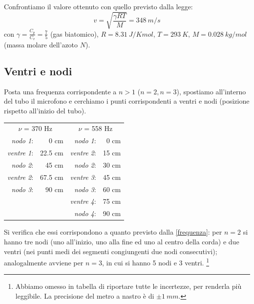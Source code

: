 
   
Confrontiamo il valore ottenuto con quello previsto dalla legge:
\begin{equation}
v=\sqrt{\frac{\gamma R T}{M}} = 348\ m/s
\end{equation}
con $\gamma=\displaystyle{\frac{C_p}{C_v}}=\frac{7}{5}$ (gas biatomico), $R=8.31\ J/K mol$, $T=293\ K$, $M= 0.028\ kg/mol$ (massa molare dell'azoto $N$).

\subsection{Ventri e nodi}

Posta una frequenza corrispondente a $n>1$ ($n=2, n=3$), spostiamo all'interno del tubo il microfono e cerchiamo i punti corrispondenti a ventri e nodi (posizione rispetto all'inizio del tubo).\\

\begin{center}
\begin{tabular}{r r r r}

\multicolumn{2}{c}{$\nu$ = 370 Hz}& \multicolumn{2}{c}{$\nu$ = 558 Hz}\\
\textit{nodo 1}:& 0 cm & \hspace{2cm}\textit{nodo 1}:& 0 cm\\
\textit{ventre 1}:& 22.5 cm & \hspace{2cm}\textit{ventre 2}:& 15 cm\\
\textit{nodo 2}:& 45 cm &\hspace{2cm}\textit{nodo 2}:& 30 cm\\
\textit{ventre 2}:& 67.5 cm &\hspace{2cm}\textit{ventre 3}:& 45 cm\\
\textit{nodo 3}:& 90 cm &\hspace{2cm} \textit{nodo 3}:& 60 cm\\
& & \textit{ventre 4}:& 75 cm \\
& & \textit{nodo 4}:& 90 cm \\
\end{tabular}
\end{center}

Si verifica che essi corrispondono a quanto previsto dalla \ref{frequenza}: per $n=2$ si hanno tre nodi (uno all'inizio, uno alla fine ed uno al centro della corda) e due ventri (nei punti medi dei segmenti congiungenti due nodi consecutivi); analogalmente avviene per $n=3$, in cui si hanno 5 nodi e 3 ventri. \footnote{Abbiamo omesso in tabella di riportare tutte le incertezze, per renderla più leggibile. La precisione del metro a nastro è di $\pm1\ mm$.}

